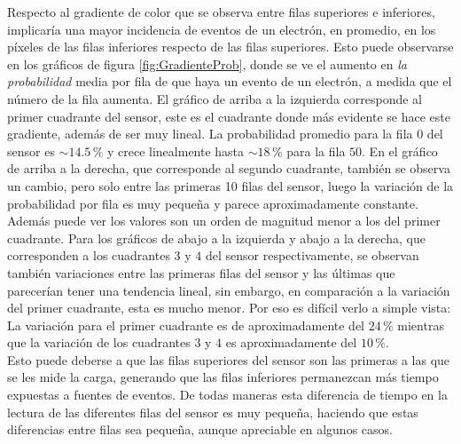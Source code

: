 Respecto al gradiente de color que se observa entre filas superiores e inferiores, implicaría una mayor incidencia de eventos de un electrón, en promedio, en los píxeles de las filas inferiores respecto de las filas superiores. Esto puede observarse en los gráficos de figura \ref{fig:GradienteProb}, donde se ve el aumento en \textit{la probabilidad} media por fila de que haya un evento de un electrón, a medida que el número de la fila aumenta. El gráfico de arriba a la izquierda corresponde al primer cuadrante del sensor, este es el cuadrante donde más evidente se hace este gradiente, además de ser muy lineal. La probabilidad promedio para la fila $0$ del sensor es $\sim 14.5\,\%$ y crece linealmente hasta $\sim 18\,\%$ para la fila $50$. En el gráfico de arriba a la derecha, que corresponde al segundo cuadrante, también se observa un cambio, pero solo entre las primeras 10 filas del sensor, luego la variación de la probabilidad por fila es muy pequeña y parece aproximadamente constante. Además puede ver los valores son un orden de magnitud menor a los del primer cuadrante. Para los gráficos de abajo a la izquierda y abajo a la derecha, que corresponden a los cuadrantes $3$ y $4$ del sensor respectivamente, se observan también variaciones entre las primeras filas del sensor y las últimas que parecerían tener una tendencia lineal, sin embargo, en comparación a la variación del primer cuadrante, esta es mucho menor. Por eso es difícil verlo a simple vista: La variación para el primer cuadrante es de aproximadamente del $24\,\%$ mientras que la variación de los cuadrantes $3$ y $4$ es aproximadamente del $10\,\%$.\\
\indent Esto puede deberse a que las filas superiores del sensor son las primeras a las que se les mide la carga, generando que las filas inferiores permanezcan más tiempo expuestas a fuentes de eventos. De todas maneras esta diferencia de tiempo en la lectura de las diferentes filas del sensor es muy pequeña, haciendo que estas diferencias entre filas sea pequeña, aunque apreciable en algunos casos.\\
